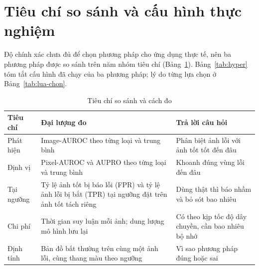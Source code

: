 \section{Tiêu chí so sánh và cấu hình thực nghiệm}
\label{sec:tieu-chi}

Độ chính xác chưa đủ để chọn phương pháp cho ứng dụng thực tế, nên ba phương pháp được so sánh trên năm nhóm tiêu chí
(Bảng~\ref{tab:criteria}). Bảng~\ref{tab:hyper} tóm tắt cấu hình đã chạy của ba phương pháp; lý do từng lựa chọn ở
Bảng~\ref{tab:lua-chon}.

\begin{table}[htbp]
  \centering
  \caption{Tiêu chí so sánh và cách đo}
  \label{tab:criteria}
  \small
  \begin{tabular}{@{}>{\raggedright\arraybackslash}p{2.5cm} >{\raggedright\arraybackslash}p{7.3cm} >{\raggedright\arraybackslash}p{4.6cm}@{}}
    \toprule
    Tiêu chí & Đại lượng đo & Trả lời câu hỏi \\
    \midrule
    Phát hiện & Image-AUROC theo từng loại và trung bình & Phân biệt ảnh lỗi với ảnh tốt tốt đến đâu \\
    Định vị & Pixel-AUROC và AUPRO theo từng loại và trung bình & Khoanh đúng vùng lỗi đến đâu \\
    Tại ngưỡng & Tỷ lệ ảnh tốt bị báo lỗi (FPR) và tỷ lệ ảnh lỗi bị bắt (TPR) tại ngưỡng đặt trên ảnh tốt tách riêng &
      Dùng thật thì báo nhầm và bỏ sót bao nhiêu \\
    Chi phí & Thời gian suy luận mỗi ảnh; dung lượng mô hình lưu lại & Có theo kịp tốc độ dây chuyền, cần bao nhiêu bộ nhớ \\
    Định tính & Bản đồ bất thường trên cùng một ảnh lỗi, cùng thang màu theo ngưỡng & Vì sao phương pháp đúng hoặc sai \\
    \bottomrule
  \end{tabular}
\end{table}

